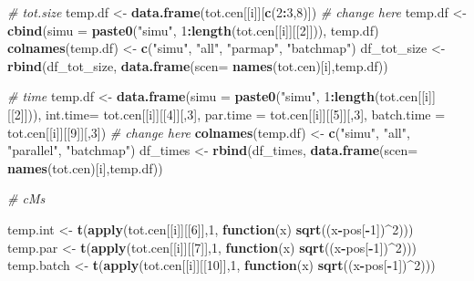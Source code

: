 \documentclass[]{article}
\newenvironment{Shaded}{\begin{snugshade}}{\end{snugshade}}
\newcommand{\CommentTok}[1]{\textcolor[rgb]{0.56,0.35,0.01}{\textit{#1}}}
\newcommand{\ControlFlowTok}[1]{\textcolor[rgb]{0.13,0.29,0.53}{\textbf{#1}}}
\newcommand{\DataTypeTok}[1]{\textcolor[rgb]{0.13,0.29,0.53}{#1}}
\newcommand{\DecValTok}[1]{\textcolor[rgb]{0.00,0.00,0.81}{#1}}
\newcommand{\KeywordTok}[1]{\textcolor[rgb]{0.13,0.29,0.53}{\textbf{#1}}}
\newcommand{\NormalTok}[1]{#1}
\newcommand{\OperatorTok}[1]{\textcolor[rgb]{0.81,0.36,0.00}{\textbf{#1}}}
\newcommand{\StringTok}[1]{\textcolor[rgb]{0.31,0.60,0.02}{#1}}
\begin{document}
\begin{Shaded}
\begin{Highlighting}[]
  \CommentTok{# tot.size}
\NormalTok{  temp.df <-}\StringTok{ }\KeywordTok{data.frame}\NormalTok{(tot.cen[[i]][}\KeywordTok{c}\NormalTok{(}\DecValTok{2}\OperatorTok{:}\DecValTok{3}\NormalTok{,}\DecValTok{8}\NormalTok{)]) }\CommentTok{# change here}
\NormalTok{  temp.df <-}\StringTok{ }\KeywordTok{cbind}\NormalTok{(}\DataTypeTok{simu =} \KeywordTok{paste0}\NormalTok{(}\StringTok{"simu"}\NormalTok{, }\DecValTok{1}\OperatorTok{:}\KeywordTok{length}\NormalTok{(tot.cen[[i]][[}\DecValTok{2}\NormalTok{]])), temp.df)}
  \KeywordTok{colnames}\NormalTok{(temp.df) <-}\StringTok{ }\KeywordTok{c}\NormalTok{(}\StringTok{"simu"}\NormalTok{, }\StringTok{"all"}\NormalTok{, }\StringTok{"parmap"}\NormalTok{, }\StringTok{"batchmap"}\NormalTok{)}
\NormalTok{  df_tot_size <-}\StringTok{ }\KeywordTok{rbind}\NormalTok{(df_tot_size, }\KeywordTok{data.frame}\NormalTok{(}\DataTypeTok{scen=} \KeywordTok{names}\NormalTok{(tot.cen)[i],temp.df))}
  
  \CommentTok{# time}
\NormalTok{  temp.df <-}\StringTok{ }\KeywordTok{data.frame}\NormalTok{(}\DataTypeTok{simu =} \KeywordTok{paste0}\NormalTok{(}\StringTok{"simu"}\NormalTok{, }\DecValTok{1}\OperatorTok{:}\KeywordTok{length}\NormalTok{(tot.cen[[i]][[}\DecValTok{2}\NormalTok{]])),}
                        \DataTypeTok{int.time=}\NormalTok{ tot.cen[[i]][[}\DecValTok{4}\NormalTok{]][,}\DecValTok{3}\NormalTok{], }
                        \DataTypeTok{par.time =}\NormalTok{ tot.cen[[i]][[}\DecValTok{5}\NormalTok{]][,}\DecValTok{3}\NormalTok{],}
                        \DataTypeTok{batch.time =}\NormalTok{ tot.cen[[i]][[}\DecValTok{9}\NormalTok{]][,}\DecValTok{3}\NormalTok{]) }\CommentTok{# change here}
  \KeywordTok{colnames}\NormalTok{(temp.df) <-}\StringTok{ }\KeywordTok{c}\NormalTok{(}\StringTok{"simu"}\NormalTok{, }\StringTok{"all"}\NormalTok{, }\StringTok{"parallel"}\NormalTok{, }\StringTok{"batchmap"}\NormalTok{)}
\NormalTok{  df_times <-}\StringTok{ }\KeywordTok{rbind}\NormalTok{(df_times, }\KeywordTok{data.frame}\NormalTok{(}\DataTypeTok{scen=} \KeywordTok{names}\NormalTok{(tot.cen)[i],temp.df))}
  
  
  \CommentTok{# cMs}
  
\NormalTok{  temp.int <-}\StringTok{ }\KeywordTok{t}\NormalTok{(}\KeywordTok{apply}\NormalTok{(tot.cen[[i]][[}\DecValTok{6}\NormalTok{]],}\DecValTok{1}\NormalTok{, }\ControlFlowTok{function}\NormalTok{(x) }\KeywordTok{sqrt}\NormalTok{((x}\OperatorTok{-}\NormalTok{pos[}\OperatorTok{-}\DecValTok{1}\NormalTok{])}\OperatorTok{^}\DecValTok{2}\NormalTok{)))}
\NormalTok{  temp.par <-}\StringTok{ }\KeywordTok{t}\NormalTok{(}\KeywordTok{apply}\NormalTok{(tot.cen[[i]][[}\DecValTok{7}\NormalTok{]],}\DecValTok{1}\NormalTok{, }\ControlFlowTok{function}\NormalTok{(x) }\KeywordTok{sqrt}\NormalTok{((x}\OperatorTok{-}\NormalTok{pos[}\OperatorTok{-}\DecValTok{1}\NormalTok{])}\OperatorTok{^}\DecValTok{2}\NormalTok{)))}
\NormalTok{  temp.batch <-}\StringTok{ }\KeywordTok{t}\NormalTok{(}\KeywordTok{apply}\NormalTok{(tot.cen[[i]][[}\DecValTok{10}\NormalTok{]],}\DecValTok{1}\NormalTok{, }\ControlFlowTok{function}\NormalTok{(x) }\KeywordTok{sqrt}\NormalTok{((x}\OperatorTok{-}\NormalTok{pos[}\OperatorTok{-}\DecValTok{1}\NormalTok{])}\OperatorTok{^}\DecValTok{2}\NormalTok{)))}
  

\end{Highlighting}
\end{Shaded}
\end{document}

